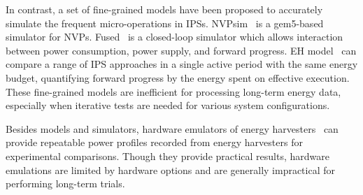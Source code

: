 In contrast, a set of fine-grained models have been proposed to accurately simulate the frequent micro-operations in IPSs. 
NVPsim~\cite{7428003} is a gem5-based simulator for NVPs.
Fused~\cite{sliper2020fused} is a closed-loop simulator which allows interaction between power consumption, power supply, and forward progress. 
EH model~\cite{8574572} can compare a range of IPS approaches in a single active period with the same energy budget, quantifying forward progress by the energy spent on effective execution. 
These fine-grained models are inefficient for processing long-term energy data, especially when iterative tests are needed for various system configurations. 

Besides models and simulators, hardware emulators of energy harvesters~\cite{10.1145/2668332.2668336, 10.1145/3356250.3360042} can provide repeatable power profiles recorded from energy harvesters for experimental comparisons. 
Though they provide practical results, hardware emulations are limited by hardware options and are generally impractical for performing long-term trials.

